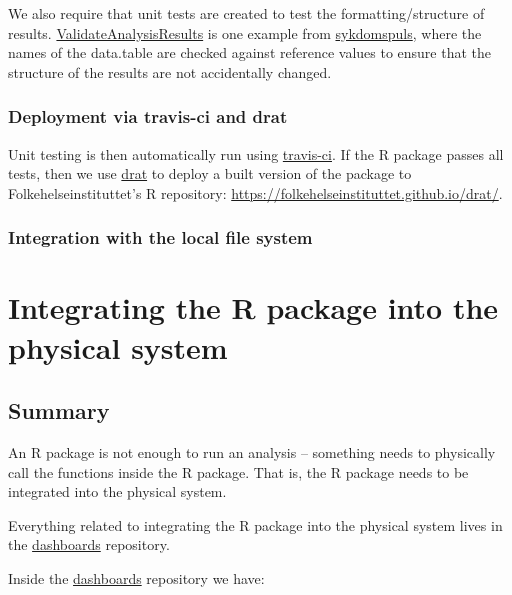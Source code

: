 \documentclass[12pt,]{article}
\begin{document}
We also require that unit tests are created to test the
formatting/structure of results.
\href{https://folkehelseinstituttet.github.io/dashboards_sykdomspuls/reference/ValidateAnalysisResults.html}{ValidateAnalysisResults}
is one example from
\href{https://folkehelseinstituttet.github.io/dashboards_sykdomspuls/}{sykdomspuls},
where the names of the data.table are checked against reference values
to ensure that the structure of the results are not accidentally
changed.

\subsubsection{Deployment via travis-ci and
drat}\label{deployment-via-travis-ci-and-drat}

Unit testing is then automatically run using
\href{http://r-pkgs.had.co.nz/check.html\#travis}{travis-ci}. If the R
package passes all tests, then we use
\href{https://github.com/eddelbuettel/drat}{drat} to deploy a built
version of the package to Folkehelseinstituttet's R repository:
\url{https://folkehelseinstituttet.github.io/drat/}.

\subsubsection{Integration with the local file
system}\label{integration-with-the-local-file-system}

\section{Integrating the R package into the physical
system}\label{integrating-the-r-package-into-the-physical-system}

\subsection{Summary}\label{summary}

An R package is not enough to run an analysis -- something needs to
physically call the functions inside the R package. That is, the R
package needs to be integrated into the physical system.

Everything related to integrating the R package into the physical system
lives in the
\href{https://github.com/folkehelseinstituttet/dashboards/}{dashboards}
repository.

Inside the
\href{https://github.com/folkehelseinstituttet/dashboards/}{dashboards}
repository we have:
\end{document}
